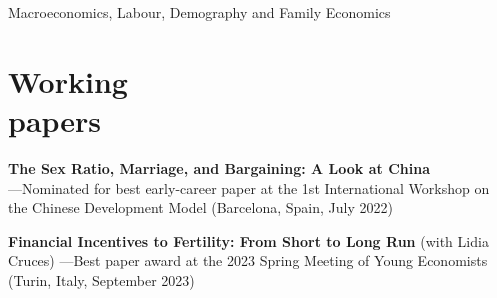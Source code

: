 \documentclass[margin]{res} %
\begin{document}
\begin{resume}
Macroeconomics, Labour, Demography and Family Economics

\section{Working \\ papers}
{\bf The Sex Ratio, Marriage, and Bargaining: A Look at China}  \\
---Nominated for best early-career paper at the 1st International Workshop on the Chinese Development Model (Barcelona, Spain, July 2022) 


{\bf Financial Incentives to Fertility: From Short to Long Run} (with Lidia Cruces)
---Best paper award at the 2023 Spring Meeting of Young Economists (Turin, Italy, September 2023)



\end{resume}
\end{document}

